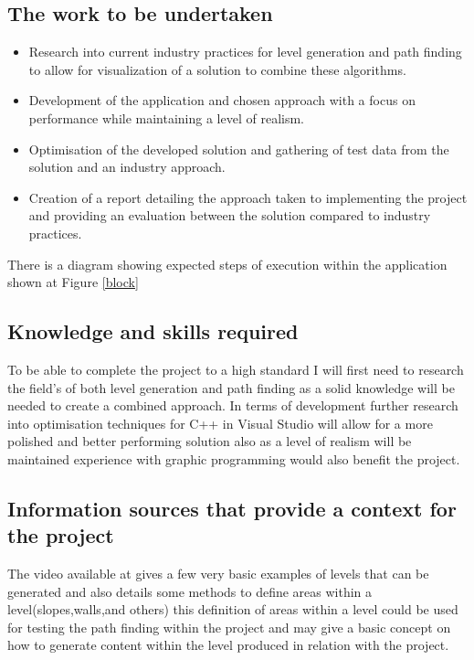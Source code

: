 \subsection{The work to be undertaken}
\begin{itemize}
\item Research into current industry practices for level generation and path finding to allow for visualization of a solution to combine these algorithms.\\
\item Development of the application and chosen approach with a focus on performance while maintaining a level of realism.\\
\item Optimisation of the developed solution and gathering of test data from the solution and an industry approach.\\
\item Creation of a report detailing the approach taken to implementing the project and providing an evaluation between the solution compared to industry practices.  
\end{itemize}
There is a diagram showing expected steps of execution within the application shown at Figure \ref{block}

\subsection{Knowledge and skills required}
To be able to complete the project to a high standard I will first need to research the field’s of both level generation and path finding as a solid knowledge will be needed to create a combined approach. In terms of development further research into optimisation techniques for C++ in Visual Studio will allow for a more polished and better performing solution also as a level of realism will be maintained experience with graphic programming would also benefit the project.  

\subsection{Information sources that provide a context for the project}
The video available at \cite{levels1} gives a few very basic examples of levels that can be generated and also details some methods to define areas within a level(slopes,walls,and others) this definition of areas within a level could be used for testing the path finding within the project and may give a basic concept on how to generate content within the level produced in relation with the project.\\

